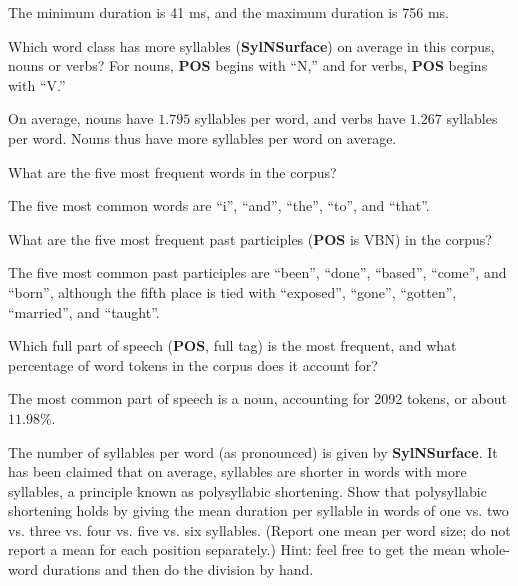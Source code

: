 \documentclass{../../templates/lkx_pset}
\begin{document}
\begin{solution}
	The minimum duration is 41 ms, and the maximum duration is 756 ms.
\end{solution}

\begin{problem}{6}
Which word class has more syllables (\textbf{SylNSurface}) on average in this corpus, nouns or verbs? For nouns, \textbf{POS} begins with “N,” and for verbs, \textbf{POS} begins with “V.”
\end{problem}

\begin{solution}
	On average, nouns have $1.795$ syllables per word, and verbs have $1.267$ syllables per word. Nouns thus have more syllables per word on average.
\end{solution}

\begin{problem}{7}
What are the five most frequent words in the corpus?
\end{problem}

\begin{solution}
	The five most common words are ``i'', ``and'', ``the'', ``to'', and ``that''.
\end{solution}

\begin{problem}{8}
What are the five most frequent past participles (\textbf{POS} is VBN) in the corpus?
\end{problem}

\begin{solution}
	The five most common past participles are ``been'', ``done'', ``based'', ``come'', and ``born'', although the fifth place is tied with ``exposed'', ``gone'', ``gotten'', ``married'', and ``taught''.
\end{solution}

\begin{problem}{9}
Which full part of speech (\textbf{POS}, full tag) is the most frequent, and what percentage of word tokens in the corpus does it account for?
\end{problem}

\begin{solution}
	The most common part of speech is a noun, accounting for 2092 tokens, or about $11.98\%$.
\end{solution}

\begin{problem}{10}
The number of syllables per word (as pronounced) is given by \textbf{SylNSurface}. It has been claimed that on average, syllables are shorter in words with more syllables, a principle known as polysyllabic shortening. Show that polysyllabic shortening holds by giving the mean duration per syllable in words of one vs. two vs. three vs. four vs. five vs. six syllables. (Report one mean per word size; do not report a mean for each position separately.) Hint: feel free to get the mean whole-word durations and then do the division by hand.
\end{problem}
\end{document}
